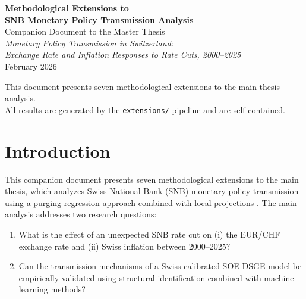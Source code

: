 \documentclass[12pt,a4paper]{article}
\begin{document}
\thispagestyle{empty}
\vspace*{2cm}
\begin{center}
	{\LARGE\bfseries Methodological Extensions to\\[0.4cm]
	SNB Monetary Policy Transmission Analysis}\\[1.5cm]
	{\large Companion Document to the Master Thesis}\\[0.5cm]
	{\large\itshape Monetary Policy Transmission in Switzerland:\\
	Exchange Rate and Inflation Responses to Rate Cuts, 2000--2025}\\[2cm]
	{\large February 2026}
\end{center}
\vfill
\begin{center}
	\small This document presents seven methodological extensions to the main thesis analysis.\\
	All results are generated by the \texttt{extensions/} pipeline and are self-contained.
\end{center}

\newpage
\tableofcontents
\newpage

\section{Introduction}\label{sec:introduction}

This companion document presents seven methodological extensions to the main thesis, which analyzes Swiss National Bank (SNB) monetary policy transmission using a purging regression approach combined with local projections \citep{jorda2005}. The main analysis addresses two research questions:

\begin{enumerate}[label=\textbf{RQ\arabic*:}, leftmargin=*, itemsep=0.4em]
	\item What is the effect of an unexpected SNB rate cut on (i) the EUR/CHF exchange rate and (ii) Swiss inflation between 2000--2025?
	\item Can the transmission mechanisms of a Swiss-calibrated SOE DSGE model be empirically validated using structural identification combined with machine-learning methods?
\end{enumerate}
\end{document}
